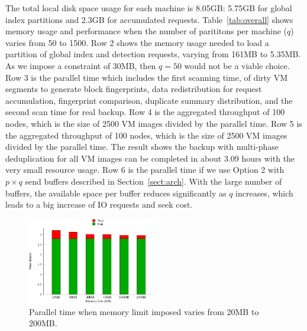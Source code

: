 The total local disk space usage for each machine is 8.05GB:  5.75GB for global index partitions and 2.3GB for accumulated requests.
Table~\ref{tab:overall} shows memory usage and performance when 
the number of parititons per machine ($q$) varies from 50 to 1500.
Row 2 shows the memory usage needed to load a partition of global index and detection requests,
varying from 161MB to 5.35MB. As we impose a constraint of 30MB, then $q=50$ would not be a viable choice.
Row 3 is the parallel time which includes the first scanning time, 
of dirty VM segments to generate block fingerprints, data redistribution for request accumulation,
fingerprint comparison, duplicate summary distribution, and the second scan time for real backup.
Row 4 is  the aggregated throughput of  100 nodes, which is  
the size of 2500 VM images divided by the parallel time. 
Row 5 is  the aggregated throughput of  100 nodes, which is  the size of 2500 VM images divided by the parallel time. 
The result shows the backup with multi-phase deduplication  for all VM images can be completed in about 3.09 hours
with the very small resource usage.
Row 6 is  the parallel time if  we use Option 2 with $p\times q$ send buffers described in Section~\ref{sect:arch}. 
With the large number of buffers, the available space per buffer reduces significantly as $q$ increases, which leads to
a big increase of IO requests and seek cost.  







\begin{figure}
\centering
\includegraphics[width=0.5\textwidth]{mem_time.pdf}
\caption{ Parallel time when memory limit imposed varies from 20MB to 200MB.}
\label{fig:memory}
\end{figure}

